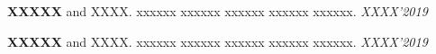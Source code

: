


\cvpublication
{\textbf{XXXXX} and XXXX. xxxxxx xxxxxx xxxxxx xxxxxx xxxxxx. \textit{XXXX'2019}}
\vspace{-4mm}

\cvpublication
{\textbf{XXXXX} and XXXX. xxxxxx xxxxxx xxxxxx xxxxxx xxxxxx. \textit{XXXX'2019}}
